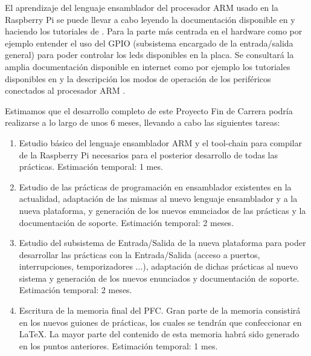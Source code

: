 El aprendizaje del lenguaje ensamblador del procesador ARM usado en la Raspberry Pi
se puede llevar a cabo leyendo la documentación disponible en \cite{DATH}
y haciendo los tutoriales de \cite{TASM}.
Para la parte más centrada en el hardware como por ejemplo entender el uso del GPIO
(subsistema encargado de la entrada/salida general) para poder controlar los leds
disponibles en la placa. Se consultará la
amplia documentación disponible en internet como por ejemplo los tutoriales disponibles en
\cite{BKPI}
y la descripción los modos de operación de los periféricos conectados al procesador ARM
\cite{ARMP}.

Estimamos que el desarrollo completo de este Proyecto Fin de Carrera podría realizarse
a lo largo de unos 6 meses, llevando a cabo las siguientes tareas:

\begin{enumerate}
  \item Estudio básico del lenguaje ensamblador ARM y el tool-chain para compilar de la
        Raspberry Pi necesarios para el posterior desarrollo de todas las prácticas. 
        Estimación temporal: 1 mes.

  \item Estudio de las prácticas de programación en ensamblador existentes en la actualidad,
        adaptación de las mismas al nuevo lenguaje ensamblador y a la nueva plataforma,
        y generación de los nuevos enunciados de las prácticas y la documentación de soporte. 
        Estimación temporal: 2 meses.

  \item Estudio del subsistema de Entrada/Salida de la nueva plataforma para poder desarrollar
        las prácticas con la Entrada/Salida (acceso a puertos, interrupciones, temporizadores
        ...), adaptación de dichas prácticas al nuevo sistema y generación de los nuevos
        enunciados y documentación de soporte. 
        Estimación temporal: 2 meses.

  \item Escritura de la memoria final del PFC. Gran parte de la memoria consistirá en los
        nuevos guiones de prácticas, los cuales se tendrán que confeccionar en LaTeX. La
        mayor parte del contenido de esta memoria habrá sido generado en los puntos anteriores.
        Estimación temporal: 1 mes.
\end{enumerate}

